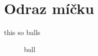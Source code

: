 \section{Odraz míčku}
\label{sec:odraz-micku}

this so balls
\begin{figure}[htbp]
 \centering
 

 \caption{ball}
 \label{fig:ball}
\end{figure}
